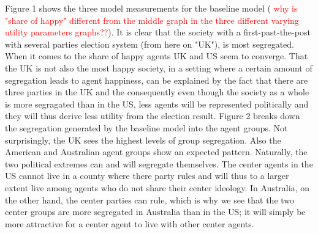 \documentclass[12pt, a4paper]{article}
\begin{document}
Figure 1 shows the three model measurements for the baseline model ( \textcolor{red}{why is "share of happy" different from the middle graph in the three different varying utility parameters graphs??}). It is clear that the society with a first-past-the-post with several parties election system (from here on "UK"), is most segregated. When it comes to the share of happy agents UK and US seem to converge. That the UK is not also the most happy society, in a setting where a certain amount of segregation leads to agent happiness, can be explained by the fact that there are three parties in the UK and the consequently even though the society as a whole is more segragated than in the US, less agents will be represented politically and they will thus derive less utility from the election result. Figure 2 breaks down the segregation generated by the baseline model into the agent groups. Not surprisingly, the UK sees the highest levels of group segregation. Also the American and Australian agent groups show an expected pattern. Naturally, the two political extremes can and will segregate themselves. The center agents in the US cannot live in a county where there party rules and will thus to a larger extent live among agents who do not share their center ideology. In Australia, on the other hand, the center parties can rule, which is why we see that the two center groups are more segregated in Australia than in the US; it will simply be more attractive for a center agent to live with other center agents. \newline \newline
\end{document}
